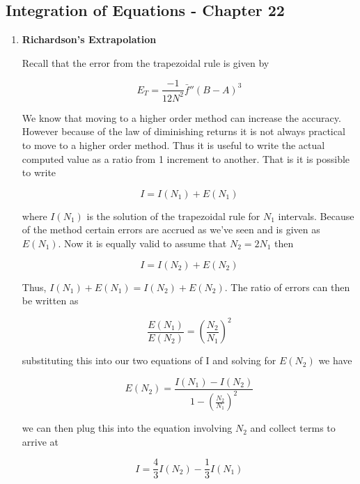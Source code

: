\subsection{Integration of Equations - Chapter 22}

\begin{enumerate}

\item {\bf Richardson's Extrapolation}

  Recall that the error from the trapezoidal rule is given by
  
  \begin{equation}
    E_T = \frac{-1}{12 N^2} \bar{f}''(B-A)^3
  \end{equation}

  We know that moving to a higher order method can increase the
  accuracy. However because of the law of diminishing returns it is
  not always practical to move to a higher order method. Thus it is
  useful to write the actual computed value as a ratio from 1
  increment to another. That is it is possible to write

  \begin{equation}
    I = I(N_1) + E(N_1)
  \end{equation}

  where $I(N_1)$ is the solution of the trapezoidal rule for $N_1$
  intervals. Because of the method certain errors are accrued as we've
  seen and is given as $E(N_1)$. Now it is equally valid to assume that
  $N_2 = 2N_1$ then

  \begin{equation}
    I = I(N_2) + E(N_2)
  \end{equation}

  Thus, $I(N_1) + E(N_1) = I(N_2) + E(N_2)$. The ratio of errors can
  then be written as

  \begin{equation}
    \frac{E(N_1)}{E(N_2)} = \left(\frac{N_2}{N_1}\right)^2
  \end{equation}

  substituting this into our two equations of I and solving for
  $E(N_2)$ we have

  \begin{equation}
    E(N_2) = \frac{I(N_1)-I(N_2)}{1-\left(\frac{N_2}{N_1}\right)^2}
  \end{equation}

  we can then plug this into the equation involving $N_2$ and collect
  terms to arrive at

  \begin{equation}
    I = \frac{4}3 I(N_2) - \frac{1}3 I(N_1)
  \end{equation}


\end{enumerate}

